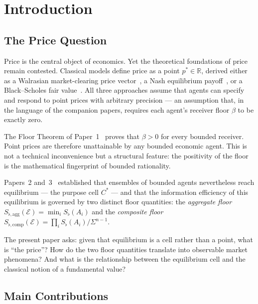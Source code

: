 \documentclass[twocolumn,11pt,a4paper]{article}
\theoremstyle{remark}
\newcommand{\R}{\mathbb{R}}
\newcommand{\Sflat}{S_{\flat}}
\newcommand{\Ens}{\mathcal{E}}
\newcommand{\SflatT}{S_{\flat,\mathrm{agg}}}        %
\newcommand{\SflatI}{S_{\flat,\mathrm{comp}}}       %
\begin{document}
\tableofcontents

\bigskip

\section{Introduction}
\label{sec:intro}

\subsection{The Price Question}
\label{sec:intro:price-q}

Price is the central object of economics.  Yet the theoretical foundations
of price remain contested.  Classical models define price as a point
$p^* \in \R$, derived either as a Walrasian market-clearing price
vector~\cite{arrowdebreu1954,debreu1959}, a Nash equilibrium payoff~\cite{nash1950},
or a Black--Scholes fair value~\cite{blackscholes1973}.  All three
approaches assume that agents can specify and respond to point prices with
arbitrary precision — an assumption that, in the language of the companion
papers, requires each agent's receiver floor $\beta$ to be exactly zero.

The Floor Theorem of Paper~1~\cite{sachikonye2025agents} proves that
$\beta > 0$ for every bounded receiver.  Point prices are therefore
unattainable by any bounded economic agent.  This is not a technical
inconvenience but a structural feature: the positivity of the floor is the
mathematical fingerprint of bounded rationality.

Papers~2 and~3~\cite{sachikonye2025market,sachikonye2025het} established
that ensembles of bounded agents nevertheless reach equilibrium — the
purpose cell $C^*$ — and that the information efficiency of this equilibrium
is governed by two distinct floor quantities: the \emph{aggregate floor}
$\SflatT(\Ens) = \min_i \Sflat(A_i)$ and the \emph{composite floor}
$\SflatI(\Ens) = \prod_i \Sflat(A_i)/\Sigma^{n-1}$.

The present paper asks: given that equilibrium is a cell rather than a
point, what is ``the price''?  How do the two floor quantities translate
into observable market phenomena?  And what is the relationship between the
equilibrium cell and the classical notion of a fundamental value?

\subsection{Main Contributions}
\label{sec:intro:contrib}
\end{document}
